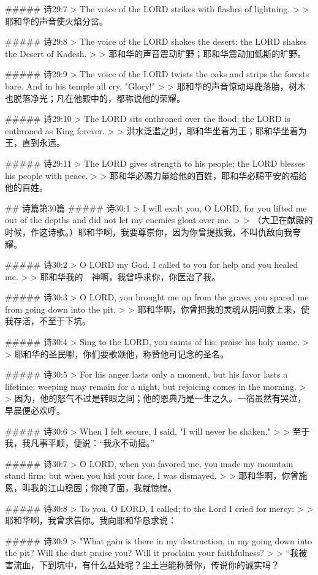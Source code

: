 ##### 诗29:7
> The voice of the LORD strikes with flashes of lightning.
>
> 耶和华的声音使火焰分岔。


##### 诗29:8
> The voice of the LORD shakes the desert; the LORD shakes the Desert of Kadesh.
>
> 耶和华的声音震动旷野；耶和华震动加低斯的旷野。


##### 诗29:9
> The voice of the LORD twists the oaks and strips the forests bare. And in his temple all cry, "Glory!"
>
> 耶和华的声音惊动母鹿落胎，树木也脱落净光；凡在他殿中的，都称说他的荣耀。


##### 诗29:10
> The LORD sits enthroned over the flood; the LORD is enthroned as King forever.
>
> 洪水泛滥之时，耶和华坐着为王；耶和华坐着为王，直到永远。


##### 诗29:11
> The LORD gives strength to his people; the LORD blesses his people with peace.
>
> 耶和华必赐力量给他的百姓，耶和华必赐平安的福给他的百姓。


## 诗篇第30篇
##### 诗30:1
> I will exalt you, O LORD, for you lifted me out of the depths and did not let my enemies gloat over me.
>
> （大卫在献殿的时候，作这诗歌。）耶和华啊，我要尊崇你，因为你曾提拔我，不叫仇敌向我夸耀。


##### 诗30:2
> O LORD my God, I called to you for help and you healed me.
>
> 耶和华我的　神啊，我曾呼求你，你医治了我。


##### 诗30:3
> O LORD, you brought me up from the grave; you spared me from going down into the pit.
>
> 耶和华啊，你曾把我的灵魂从阴间救上来，使我存活，不至于下坑。


##### 诗30:4
> Sing to the LORD, you saints of his; praise his holy name.
>
> 耶和华的圣民哪，你们要歌颂他，称赞他可记念的圣名。


##### 诗30:5
> For his anger lasts only a moment, but his favor lasts a lifetime; weeping may remain for a night, but rejoicing comes in the morning.
>
> 因为，他的怒气不过是转眼之间；他的恩典乃是一生之久。一宿虽然有哭泣，早晨便必欢呼。


##### 诗30:6
> When I felt secure, I said, "I will never be shaken."
>
> 至于我，我凡事平顺，便说：“我永不动摇。”


##### 诗30:7
> O LORD, when you favored me, you made my mountain stand firm; but when you hid your face, I was dismayed.
>
> 耶和华啊，你曾施恩，叫我的江山稳固；你掩了面，我就惊惶。


##### 诗30:8
> To you, O LORD, I called; to the Lord I cried for mercy:
>
> 耶和华啊，我曾求告你。我向耶和华恳求说：


##### 诗30:9
> "What gain is there in my destruction, in my going down into the pit? Will the dust praise you? Will it proclaim your faithfulness?
>
> “我被害流血，下到坑中，有什么益处呢？尘土岂能称赞你，传说你的诚实吗？


